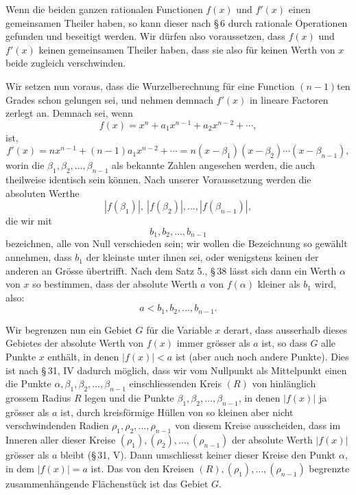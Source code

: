 \documentclass[11pt]{article}
\begin{document}
Wenn die beiden ganzen rationalen Functionen $f(x)$ und $f'(x)$ einen gemeinsamen Theiler haben, so kann dieser nach \S\,6 durch rationale Operationen gefunden und beseitigt werden. Wir dürfen also voraussetzen, dass $f(x)$ und $f'(x)$ keinen gemeinsamen Theiler haben, dass sie also für keinen Werth von $x$ beide zugleich verschwinden.

Wir setzen nun voraus, dass die Wurzelberechnung für eine Function $(n-1)$ten Grades schon gelungen sei, und nehmen demnach $f'(x)$ in lineare Factoren zerlegt an. Demnach sei, wenn
\begin{equation}
 f(x)=x^n+a_1x^{n-1}+a_2x^{n-2}+\cdots,
\tag{1}
\end{equation}
ist,
\begin{equation}
 f'(x)=nx^{n-1}+(n-1)a_1x^{n-2}+\cdots
      =n(x-\beta_1)(x-\beta_2)\cdots(x-\beta_{n-1}),
\tag{2}
\end{equation}
worin die $\beta_1,\beta_2,
\ldots,\beta_{n-1}$ als bekannte Zahlen angesehen werden, die auch theilweise identisch sein können. Nach unserer Voraussetzung werden die absoluten Werthe
\begin{equation}
 |f(\beta_1)|,\ |f(\beta_2)|,\ldots, |f(\beta_{n-1})|,
\tag{3}
\end{equation}
die wir mit
\begin{equation}
 b_1,b_2,\ldots,b_{n-1}
\tag{4}
\end{equation}
bezeichnen, alle von Null verschieden sein; wir wollen die Bezeichnung so gewählt annehmen, dass $b_1$ der kleinste unter ihnen sei, oder wenigstens keinen der anderen an Grösse übertrifft. Nach dem Satz 5., \S\,38 lässt sich dann ein Werth $\alpha$ von $x$ so bestimmen, dass der absolute Werth $a$ von $f(\alpha)$ kleiner als $b_1$ wird, also:
\begin{equation}
 a<b_1,b_2,\ldots,b_{n-1}.
\tag{5}
\end{equation}

Wir begrenzen nun ein Gebiet $G$ für die Variable $x$ derart, dass ausserhalb dieses Gebietes der absolute Werth von $f(x)$ immer grösser als $a$ ist, so dass $G$ alle Punkte $x$ enthält, in denen $|f(x)|<a$ ist (aber auch noch andere Punkte). Dies ist nach \S\,31, IV dadurch möglich, dass wir vom Nullpunkt als Mittelpunkt einen die Punkte $\alpha,\beta_1,\beta_2,
\ldots,\beta_{n-1}$ einschliessenden Kreis $(R)$ von hinlänglich grossem Radius $R$ legen und die Punkte $\beta_1,\beta_2,
\ldots,\beta_{n-1}$, in denen $|f(x)|$ ja grösser als $a$ ist, durch kreisförmige Hüllen von so kleinen aber nicht verschwindenden Radien $\rho_1,\rho_2,
\ldots,\rho_{n-1}$ von diesem Kreise ausscheiden, dass im Inneren aller dieser Kreise $(\rho_1),(\rho_2),\ldots,(\rho_{n-1})$ der absolute Werth $|f(x)|$ grösser als $a$ bleibt (\S\,31, V). Dann umschliesst keiner dieser Kreise den Punkt $\alpha$, in dem $|f(x)|=a$ ist. Das von den Kreisen $(R),(\rho_1),\ldots,(\rho_{n-1})$ begrenzte zusammenhängende Flächenstück ist das Gebiet $G$.
\end{document}

